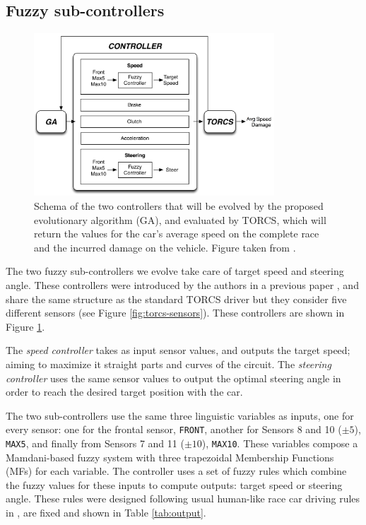 \documentclass[10pt,journal,compsoc]{IEEEtran}
\begin{document}
\subsection{Fuzzy sub-controllers}
\label{subsec:fuzzy-controllers}

\begin{figure}[!ht]
  \begin{center}
    \includegraphics[width=9cm]{fig/flowchart}
  \end{center}
  \caption{Schema of the two controllers that will be evolved by the proposed 
    evolutionary algorithm (GA), and evaluated by TORCS, which will
    return the values for the car's average speed on the complete race and the incurred damage on the vehicle. Figure taken from \cite{salem_evo18}.} 
    \label{fig:ga}
\end{figure}
%
The two fuzzy sub-controllers we evolve take care of target speed and steering angle. These controllers were introduced by the authors in a previous paper \cite{salem_evo17}, and share the same structure as the standard TORCS driver but they consider five different sensors (see Figure \ref{fig:torcs-sensors}). These controllers are shown in Figure \ref{fig:ga}. 


The \textit{speed controller} takes as input sensor values, and
outputs the target speed; aiming to maximize it straight parts and curves of the circuit. The \textit{steering controller} uses the same sensor values to output the optimal steering angle in order to reach the desired target position with the car.

The two sub-controllers use the same three linguistic variables as
inputs, one for every sensor: one for the frontal sensor,
\texttt{FRONT}, another for Sensors 8 and 10 ($\pm 5$\textdegree),
\texttt{MAX5}, and finally from Sensors 7 and 11 ($\pm
10$\textdegree), \texttt{MAX10}. These variables compose a Mamdani-based fuzzy
system \cite{iancu2012} with three trapezoidal Membership Functions
(MFs) for each variable. The controller uses a set of fuzzy rules
which combine the fuzzy values for these inputs to compute outputs:
target speed or steering angle.
% 
These rules were designed following usual human-like race car driving
rules in \cite{salem_evo18}, are fixed and shown in Table \ref{tab:output}.
\end{document}
